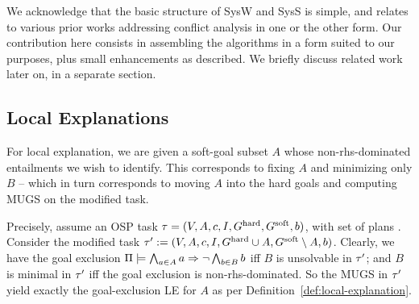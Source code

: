 We acknowledge that the basic structure of SysW and SysS is simple,
and relates to various prior works addressing conflict analysis in one
or the other form. Our contribution here consists in assembling the
algorithms in a form suited to our purposes, plus small enhancements
as described. We briefly discuss related work later on, in a separate
section.






\subsection{Local Explanations}
\label{algorithms:le}

For local explanation, we are given a soft-goal subset $A$ whose
non-rhs-dominated entailments we wish to identify. This corresponds to
fixing $A$ and minimizing only $B$ -- which in turn corresponds to
moving $A$ into the hard goals and computing MUGS on the modified
task.

Precisely, assume an OSP task $\tau =
(V,\allowbreak A,\allowbreak{\ensuremath{c}},\allowbreak I,\allowbreak G^{\text{\textup{hard}}},\allowbreak G^{\text{\textup{soft}}},\allowbreak{\ensuremath{b}})$,
with set of plans \plans. Consider the modified task $\tau' :=
(V,\allowbreak A,\allowbreak{\ensuremath{c}},\allowbreak I,\allowbreak G^{\text{\textup{hard}}}
\cup A,\allowbreak G^{\text{\textup{soft}}} \setminus
A,\allowbreak{\ensuremath{b}})$. Clearly, we have the goal exclusion
$\Pi \models \bigwedge_{a \in A} a \Rightarrow \neg \bigwedge_{b \in B} b$
iff $B$ is unsolvable in $\tau'$; and $B$ is minimal in $\tau'$ iff
the goal exclusion is non-rhs-dominated. So the MUGS in $\tau'$ yield
exactly the goal-exclusion LE for $A$ as per
Definition~\ref{def:local-explanation}.

